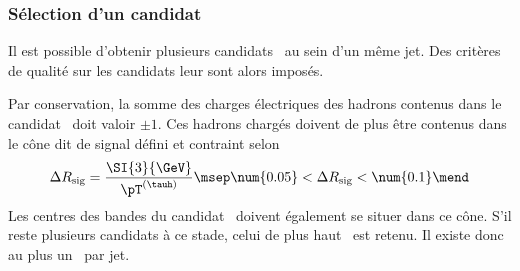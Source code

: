 \subsubsection{Sélection d'un candidat \tauh}
Il est possible d'obtenir plusieurs candidats \tauh\ au sein d'un même jet.
Des critères de qualité sur les candidats leur sont alors imposés.
\par
Par conservation, la somme des charges électriques des hadrons contenus dans le candidat \tauh\ doit valoir $\pm1$.
Ces hadrons chargés doivent de plus être contenus dans le cône dit \og de signal \fg{} défini et contraint selon
\begin{equation}
\Delta R_\text{sig} = \frac{\SI{3}{\GeV}}{\pT^{(\tauh)}}
\msep
\num{0.05} < \Delta R_\text{sig} < \num{0.1}
\mend
\end{equation}
Les centres des bandes du candidat \tauh\ doivent également se situer dans ce cône.
S'il reste plusieurs candidats à ce stade, celui de plus haut \pT\ est retenu.
Il existe donc au plus un \tauh\ par jet.
